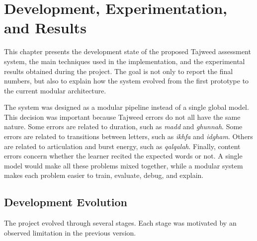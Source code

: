 \chapter{Development, Experimentation, and Results}
\label{chap:development_experimentation}

This chapter presents the development state of the proposed Tajweed assessment
system, the main techniques used in the implementation, and the experimental
results obtained during the project. The goal is not only to report the final
numbers, but also to explain how the system evolved from the first prototype to
the current modular architecture.

The system was designed as a modular pipeline instead of a single global model.
This decision was important because Tajweed errors do not all have the same
nature. Some errors are related to duration, such as \textit{madd} and
\textit{ghunnah}. Some errors are related to transitions between letters, such
as \textit{ikhfa} and \textit{idgham}. Others are related to articulation and
burst energy, such as \textit{qalqalah}. Finally, content errors concern whether
the learner recited the expected words or not. A single model would make all
these problems mixed together, while a modular system makes each problem easier
to train, evaluate, debug, and explain.

\section{Development Evolution}

The project evolved through several stages. Each stage was motivated by an
observed limitation in the previous version.

